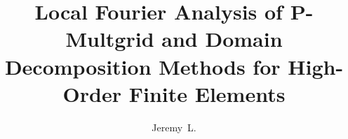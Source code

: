 \documentclass[defaultstyle,11pt]{thesis}
\title{Local Fourier Analysis of P-Multgrid and Domain Decomposition Methods for High-Order Finite Elements}
\author{Jeremy~L.}{Thompson}
\begin{document}







\nocite{*}                          %

%
%
\end{document}
